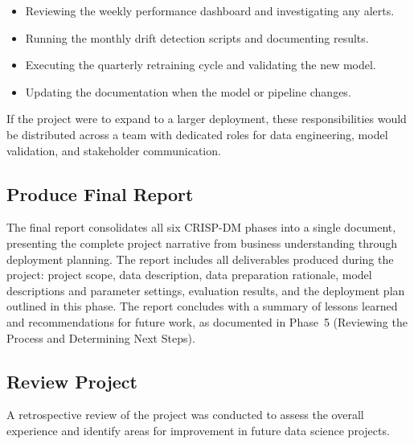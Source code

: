 \begin{itemize}
    \item Reviewing the weekly performance dashboard and investigating any alerts.
    \item Running the monthly drift detection scripts and documenting results.
    \item Executing the quarterly retraining cycle and validating the new model.
    \item Updating the documentation when the model or pipeline changes.
\end{itemize}

\noindent
If the project were to expand to a larger deployment, these responsibilities would be distributed across a team with dedicated roles for data engineering, model validation, and stakeholder communication.

\subsection{Produce Final Report}
\label{subsec:Produce Final Report}

\noindent
The final report consolidates all six CRISP-DM phases into a single document, presenting the complete project narrative from business understanding through deployment planning. The report includes all deliverables produced during the project: project scope, data description, data preparation rationale, model descriptions and parameter settings, evaluation results, and the deployment plan outlined in this phase. The report concludes with a summary of lessons learned and recommendations for future work, as documented in Phase~5 (Reviewing the Process and Determining Next Steps).

\subsection{Review Project}
\label{subsec:Review Project}

\noindent
A retrospective review of the project was conducted to assess the overall experience and identify areas for improvement in future data science projects.

